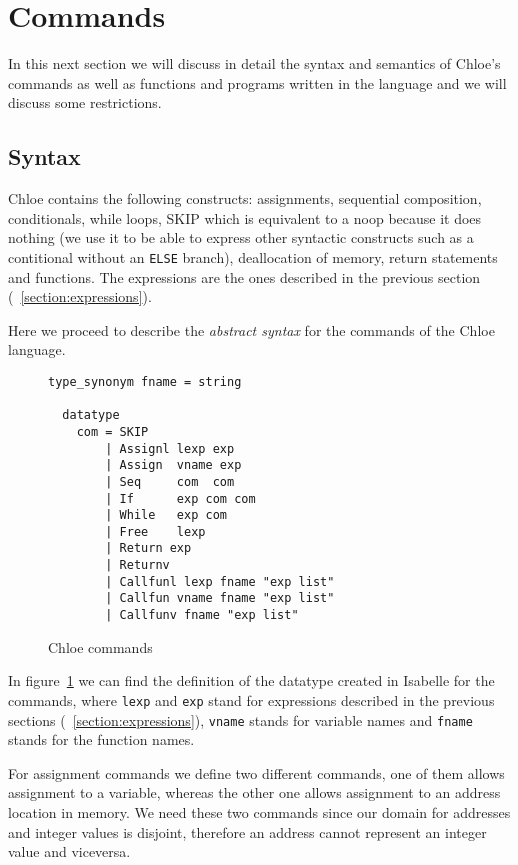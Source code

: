 \section{Commands}\label{section:commands}

In this next section we will discuss in detail the syntax and semantics of Chloe's commands as well as functions and programs written in the language and we will discuss some restrictions.

\subsection{Syntax}\label{subsection:syntax_commands}

Chloe contains the following constructs: assignments, sequential composition, conditionals, while loops, SKIP which is equivalent to a noop because it does nothing (we use it to be able to express other syntactic constructs such as a contitional without an \verb|ELSE| branch), deallocation of memory, return statements and functions.
The expressions are the ones described in the previous section (~\ref{section:expressions}).

Here we proceed to describe the \textit{abstract syntax} for the commands of the Chloe language.

\begin{figure}
  \caption{Chloe commands}
  \label{fig:chloe_commands}

  \begin{lstlisting}[frame=single, mathescape=true]
  type_synonym fname = string

  datatype
    com = SKIP
        | Assignl lexp exp
        | Assign  vname exp
        | Seq     com  com
        | If      exp com com
        | While   exp com
        | Free    lexp
        | Return exp
        | Returnv
        | Callfunl lexp fname "exp list"
        | Callfun vname fname "exp list"
        | Callfunv fname "exp list"
  \end{lstlisting}
\end{figure}

In figure~\ref{fig:chloe_commands} we can find the definition of the datatype created in Isabelle for the commands, where \verb|lexp| and \verb|exp| stand for expressions described in the previous sections (~\ref{section:expressions}), \verb|vname| stands for variable names and \verb|fname| stands for the function names.

For assignment commands we define two different commands, one of them allows assignment to a variable, whereas the other one allows assignment to an address location in memory.
We need these two commands since our domain for addresses and integer values is disjoint, therefore an address cannot represent an integer value and viceversa.

